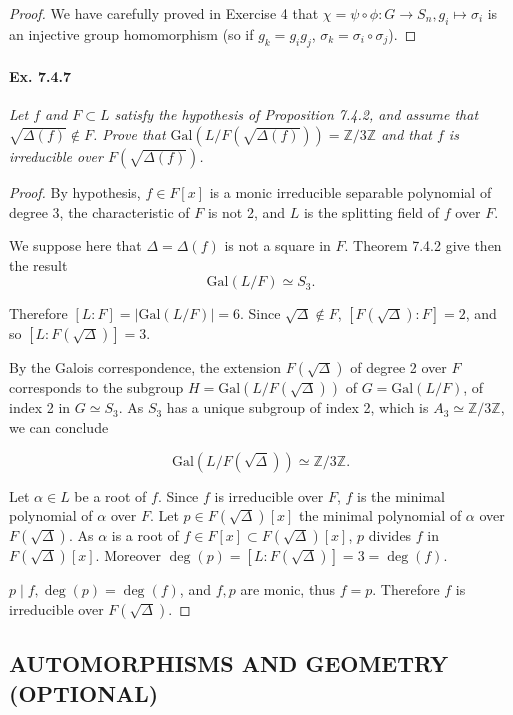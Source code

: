 \documentclass[11pt,a4paper]{article}
\newcommand{\Z}{\mathbb{Z}}
\newcommand{\Gal}{\mathrm{Gal}}
\begin{document}
\begin{proof}
We have carefully proved in Exercise 4 that $\chi = \psi \circ \phi : G \to S_n, g_i \mapsto \sigma_i$ is an injective group homomorphism (so if $g_k = g_i g_j$, $\sigma_k = \sigma_i \circ \sigma_j$).

\end{proof}

\paragraph{Ex. 7.4.7}

{\it Let $f$ and $F\subset L$ satisfy the hypothesis of Proposition 7.4.2, and assume that $\sqrt{\Delta(f)} \not \in F$. Prove that $\Gal\left(L/F\left(\sqrt{\Delta(f)}\right)\right) = \Z/3\Z$ and that $f$ is irreducible over $F\left(\sqrt{\Delta(f)}\right)$.
}

\begin{proof}
By hypothesis, $f\in F[x]$ is a monic irreducible separable polynomial of degree 3, the characteristic of $F$ is not 2, and $L$ is the splitting field of $f$ over $F$.

We suppose here that $\Delta = \Delta(f)$ is not a square in $F$. Theorem 7.4.2 give then the result
$$\Gal(L/F) \simeq S_3.$$

Therefore $[L:F] = \vert \Gal(L/F) \vert = 6$. Since $\sqrt{\Delta} \not \in F$, $[F(\sqrt{\Delta}) : F] = 2$, and so $[L : F(\sqrt{\Delta})] = 3$.

By the Galois correspondence, the extension $F(\sqrt{\Delta})$ of degree 2 over $F$ corresponds to the subgroup $H = \Gal(L/F(\sqrt{\Delta}))$ of $G = \Gal(L/F)$, of index 2 in $G\simeq S_3$. As $S_3$ has a unique subgroup of index 2, which is $A_3 \simeq \Z/3\Z$, we can conclude

$$\Gal(L/F(\sqrt{\Delta})) \simeq \Z/3\Z.$$

Let $\alpha \in L$ be a root of $f$. Since $f$ is irreducible over $F$, $f$ is the minimal polynomial of $\alpha$ over $F$. Let $p \in F(\sqrt{\Delta})[x]$ the minimal polynomial of $\alpha$ over $F(\sqrt{\Delta})$. As $\alpha$ is a root of $f \in F[x] \subset F(\sqrt{\Delta})[x]$, $p$ divides $f$ in $F(\sqrt{\Delta})[x]$. Moreover $\deg(p) = [L:F(\sqrt{\Delta})] = 3 = \deg(f)$.

$p \mid f, \deg(p) = \deg(f)$, and $f,p$ are monic, thus $f = p$. Therefore $f$ is irreducible over $F(\sqrt{\Delta})$.
\end{proof}

\subsection{AUTOMORPHISMS AND GEOMETRY (OPTIONAL)}
\end{document}
